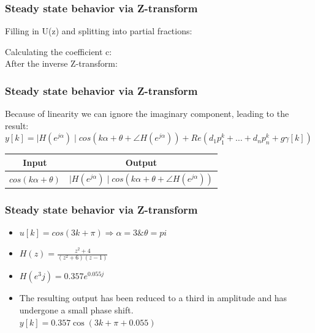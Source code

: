 \begin{frame}
	\frametitle{Steady state behavior via Z-transform}
	Filling in U(z) and splitting into partial fractions:
	
	Calculating the coefficient c:\\
	After the inverse Z-transform:\\
	
	
\end{frame}
\begin{frame}
	\frametitle{Steady state behavior via Z-transform}
	Because of linearity we can ignore the imaginary component, leading to the result:\\
	$y[k] =  \mid H(e^{j\alpha}) \mid cos(k\alpha+\theta+\angle H(e^{j\alpha})) + Re(d_1p_1^k+\dots+d_np_n^{k}+g\gamma[k])$\\
	\begin{tabular}{|c|c|}
		\hline Input & Output \\ 
		\hline $cos(k\alpha + \theta)$ &  $\mid H(e^{j\alpha}) \mid cos(k\alpha+\theta+\angle H(e^{j\alpha}))$ \\ 
		\hline 
	\end{tabular} 
\end{frame}
\begin{frame}
	\frametitle{Steady state behavior via Z-transform}
	\begin{example}
		\begin{itemize}
			\item $u[k] = cos(3k+\pi) \Rightarrow \alpha = 3 \& \theta = pi$
			\item $H(z) = \frac{z^2+4}{(z^2+6)(z-1)}$
			\item $H(e^3j) = 0.357e^{0.055j}$
			\item The resulting output has been reduced to a third in amplitude and has undergone a small phase shift. \\
			$ y[k] =0.357 \cos(3k+\pi + 0.055)$
			
		\end{itemize}
	\end{example}
\end{frame}
